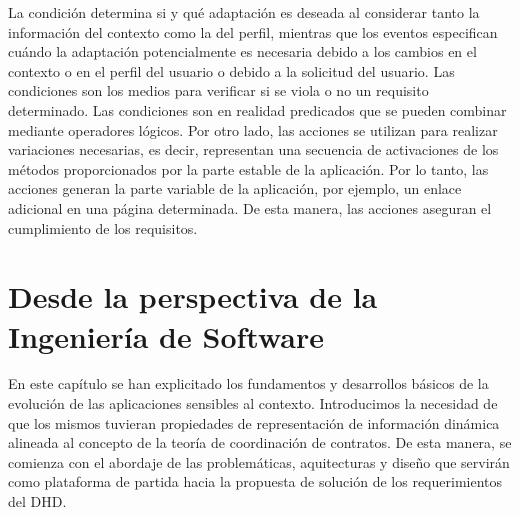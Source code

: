 La condición determina si y qué adaptación es deseada al considerar tanto la información del contexto como la del perfil, mientras que los eventos especifican cuándo la adaptación potencialmente es necesaria debido a los cambios en el contexto o en el perfil del usuario o debido a la solicitud del usuario. Las condiciones son los medios para verificar si se viola o no un requisito determinado. Las condiciones son en realidad predicados que se pueden combinar mediante operadores lógicos. Por otro lado, las acciones se utilizan para realizar variaciones necesarias, es decir, representan una secuencia de activaciones de los métodos proporcionados por la parte estable de la aplicación. Por lo tanto, las acciones generan la parte variable de la aplicación, por ejemplo, un enlace adicional en una página determinada. De esta manera, las acciones aseguran el cumplimiento de los requisitos.







\section{Desde la perspectiva de la Ingeniería de Software}
 
En este capítulo se han explicitado los fundamentos y desarrollos básicos de la evolución de las aplicaciones sensibles al contexto. Introducimos la necesidad de que los mismos tuvieran propiedades de representación de información dinámica alineada al concepto de la teoría de coordinación de contratos. De esta manera, se comienza con el abordaje de las problemáticas, aquitecturas y diseño que servirán como plataforma de partida hacia la propuesta de solución de los requerimientos del DHD.

